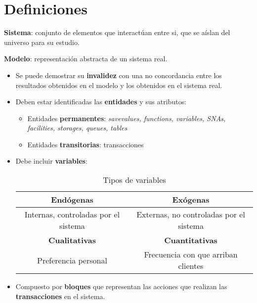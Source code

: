 \documentclass[12pt,a4paper, twoside]{paquetes-apunte/apunte}
\providecommand{\tabularnewline}{\\}
\begin{document}
\maketitle

\section{Definiciones}

\textbf{Sistema}: conjunto de elementos que interactúan entre si,
que se aíslan del universo para su estudio.

\textbf{Modelo}: representación abstracta de un sistema real.
\begin{itemize}
\item Se puede demostrar su \textbf{invalidez} con una no concordancia entre
los resultados obtenidos en el modelo y los obtenidos en el sistema
real.
\item Deben estar identificadas las \textbf{entidades} y sus atributos:

\begin{itemize}
\item Entidades \textbf{permanentes}: \emph{savevalues, functions, variables,
SNAs, facilities, storages, queues, tables}
\item Entidades \textbf{transitorias}: transacciones
\end{itemize}
\item Debe incluir \textbf{variables}:


\noindent \begin{center}
\begin{table}[H]
\noindent \begin{centering}
\begin{tabular}{|c|c|}
\hline 
\textbf{Endógenas} & \textbf{Exógenas}\tabularnewline
\hline 
\hline 
Internas, controladas por el sistema & Externas, no controladas por el sistema\tabularnewline
\hline 
\textbf{Cualitativas} & \textbf{Cuantitativas}\tabularnewline
\hline 
\hline 
Preferencia personal & Frecuencia con que arriban clientes\tabularnewline
\hline 
\end{tabular}
\par\end{centering}

\caption{Tipos de variables}


\end{table}

\par\end{center}

\item Compuesto por \textbf{bloques }que representan las acciones que realizan
las \textbf{transacciones} en el sistema\@.
\end{itemize}
\end{document}
